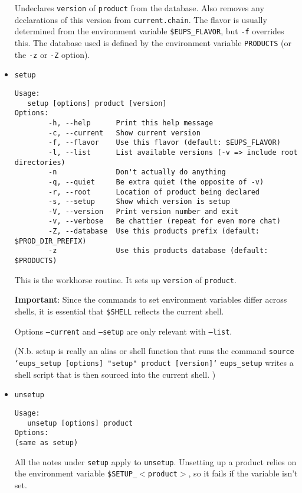 \documentclass{article}
\begin{document}
\begin{itemize}
Undeclares \texttt{version} of \texttt{product} from the
database. Also removes any declarations of this version from
\texttt{current.chain}. The flavor is usually determined from the
environment variable \texttt{\$EUPS\_FLAVOR}, but \texttt{-f}
overrides this. The database used is defined by the environment
variable \texttt{PRODUCTS} (or the \texttt{-z} or \texttt{-Z} option).


\item \texttt{setup}
\begin{verbatim}
Usage:
   setup [options] product [version]
Options:
        -h, --help      Print this help message
        -c, --current   Show current version
        -f, --flavor    Use this flavor (default: $EUPS_FLAVOR)
        -l, --list      List available versions (-v => include root directories)
        -n              Don't actually do anything
        -q, --quiet     Be extra quiet (the opposite of -v)
        -r, --root      Location of product being declared
        -s, --setup     Show which version is setup
        -V, --version   Print version number and exit
        -v, --verbose   Be chattier (repeat for even more chat)
        -Z, --database  Use this products prefix (default: $PROD_DIR_PREFIX)
        -z              Use this products database (default: $PRODUCTS)
\end{verbatim}

This is the workhorse routine. It sets up \texttt{version} of \texttt{product}.

\textbf{Important}: Since the commands to set environment variables differ across shells,
it is essential that \texttt{\$SHELL} reflects the current shell.

Options \texttt{--current} and \texttt{--setup} are only relevant with \texttt{--list}.

(N.b. setup is really an alias or shell function that runs the command\hfil\break
\texttt{source `eups\_setup [options] "setup" product [version]`}\hfil\break
\texttt{eups\_setup} writes a shell script that is then sourced into the
current shell.
)


\item \texttt{unsetup}
\begin{verbatim}
Usage:
   unsetup [options] product
Options:
(same as setup)
\end{verbatim}
  
All the notes under \texttt{setup} apply to
\texttt{unsetup}. Unsetting up a product relies on the environment
variable \texttt{\$SETUP\_$<$product$>$}, so it fails if the variable
isn't set.

\end{itemize}
\end{document}
